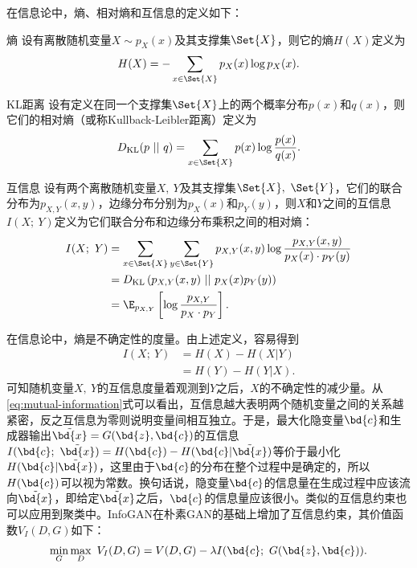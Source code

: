 在信息论中，熵、相对熵和互信息的定义如下\citep{cover2012elements}：
\begin{definition}{熵}
  设有离散随机变量$X \sim p_X(x)$及其支撑集$\Set{X}$，则它的熵$H(X)$定义为
  \begin{equation}
    H(X) = -\sum_{x\in\Set{X}} p_X(x) \log p_X(x).
  \end{equation}
  \label{def:entropy}
\end{definition}
\begin{definition}{KL距离}
  设有定义在同一个支撑集$\Set{X}$上的两个概率分布$p(x)$和$q(x)$，则它们的相对熵（或称Kullback-Leibler距离）定义为
  \begin{equation}
    D_{\text{KL}}(p~||~q) = \sum_{x\in\Set{X}} p(x)\log \frac{p(x)}{q(x)}.
  \end{equation}
  \label{def:relative-entropy}
\end{definition}
\begin{definition}{互信息}
  设有两个离散随机变量$X,~Y$及其支撑集$\Set{X},~\Set{Y}$，它们的联合分布为$p_{X,Y}(x, y)$，边缘分布分别为$p_X(x)$和$p_Y(y)$，则$X$和$Y$之间的互信息$I(X;~Y)$定义为它们联合分布和边缘分布乘积之间的相对熵：
  \begin{equation}
    \begin{split}
      I(X;~Y) &= \sum_{x\in\Set{X}}\sum_{y\in\Set{Y}} 
      p_{X,Y}(x,y) \log\frac{p_{X,Y}(x,y)}{p_X(x) \cdot p_Y(y)}  \\
            &= D_{\text{KL}}\left( p_{X,Y}(x,y)~||~p_X(x) p_Y(y) \right) \\
            &= \E_{p_{X,Y}} \left[ 
              \log\frac{p_{X,Y}}{p_X \cdot p_Y}
              \right].
    \end{split}
    \label{eq:mutual-information}
  \end{equation}
  \label{def:mutual-information}
\end{definition}

在信息论中，熵是不确定性的度量。由上述定义，容易得到
\begin{equation}
  \begin{split}
    I(X;~Y) &= H(X) - H(X|Y) \\
    &= H(Y) - H(Y|X).
  \end{split}
\end{equation}
可知随机变量$X,~Y$的互信息度量着观测到$Y$之后，$X$的不确定性的减少量。从\eqref{eq:mutual-information}式可以看出，互信息越大表明两个随机变量之间的关系越紧密，反之互信息为零则说明变量间相互独立。于是，最大化隐变量$\bd{c}$和生成器输出$\tilde{\bd{x}} = G(\bd{z}, \bd{c})$的互信息$I(\bd{c}; ~\tilde{\bd{x}}) = H(\bd{c}) - H(\bd{c}|\tilde{\bd{x}})$等价于最小化$H(\bd{c}|\tilde{\bd{x}})$，这里由于$\bd{c}$的分布在整个过程中是确定的，所以$H(\bd{c})$可以视为常数。换句话说，隐变量$\bd{c}$的信息量在生成过程中应该流向$\tilde{\bd{x}}$，即给定$\tilde{\bd{x}}$之后，$\bd{c}$的信息量应该很小。类似的互信息约束也可以应用到聚类中\citep{bridle1992unsupervised,barber2006kernelized,krause2010discriminative}。InfoGAN在朴素GAN的基础上增加了互信息约束，其价值函数$V_I(D,G)$如下：
\begin{equation}
  \min_G\max_D ~V_I(D,G) = V(D,G) - \lambda I(\bd{c};~G(\bd{z},\bd{c})).
\end{equation}


